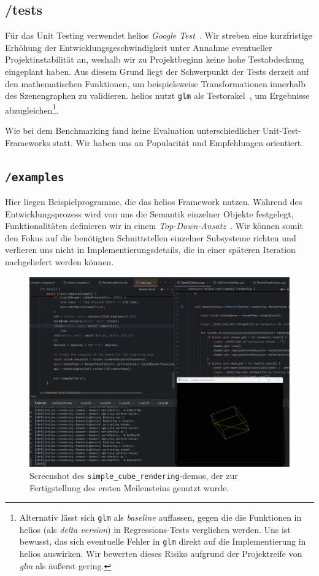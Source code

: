 \subsection*{/tests}
\noindent
Für das Unit Testing verwendet helios \textit{Google Test}~\cite[]{googletestgithub}.
Wir streben eine kurzfristige Erhöhung der Entwicklungsgeschwindigkeit unter Annahme eventueller Projektinstabilität an, weshalb wir zu Projektbeginn keine hohe Testabdeckung eingeplant haben.
Aus diesem Grund liegt der Schwerpunkt der Tests derzeit auf den mathematischen Funktionen, um beispielsweise Transformationen innerhalb des Szenengraphen zu validieren. helios nutzt \texttt{glm} als Testorakel~\cite[917 ff.]{Bin99}, um Ergebnisse abzugleichen\footnote{
    Alternativ lässt sich \texttt{glm} als \textit{baseline} auffassen, gegen die die Funktionen in helios (als \textit{delta version}) in Regressions-Tests verglichen werden. Uns ist bewusst, das sich eventuelle Fehler in \texttt{glm} direkt auf die Implementierung in helios auswirken. Wir bewerten dieses Risiko aufgrund der Projektreife von \textit{glm} als äußerst gering.
}.


\noindent
Wie bei dem Benchmarking fand keine Evaluation unterschiedlicher Unit-Test-Frameworks statt.
Wir haben uns an Popularität und Empfehlungen orientiert.

\subsection*{\texttt{/examples}}
Hier liegen Beispielprogramme, die das helios Framework nutzen.
Während des Entwicklungsprozess wird von uns die Semantik einzelner Objekte festgelegt, Funktionalitäten definieren wir in einem \textit{Top-Down-Ansatz}~\cite[]{Wir71}.
Wir können somit den Fokus auf die benötigten Schnittstellen einzelner Subsysteme richten und verlieren uns nicht in Implementierungsdetails, die in einer späteren Iteration nachgeliefert werden können.

\begin{figure}[!h]
    \centering
    \includegraphics[width=1\columnwidth]{img/cube_example}
    \caption{Screenshot des \texttt{simple\_cube\_rendering}-demos, der zur Fertigstellung des ersten Meilensteins genutzt wurde.}
    \label{fig:simple-cube-rendering-demo}
\end{figure}

